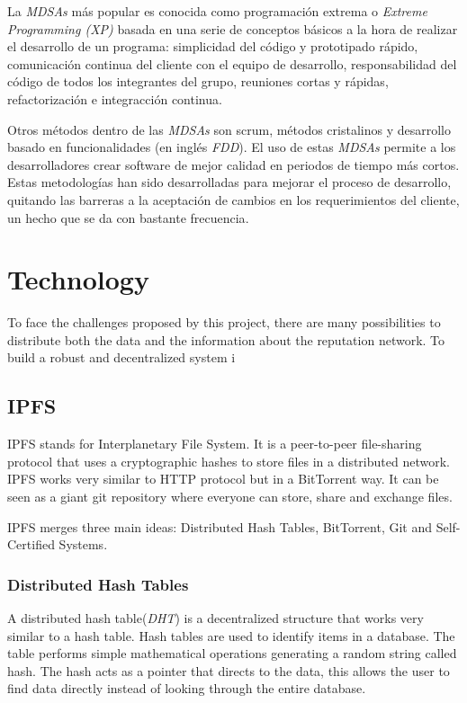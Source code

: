 La \emph{MDSAs} más popular es conocida como programación extrema o
\emph{Extreme Programming (XP)}\cite{lindstrom2004extreme} basada en una serie
de conceptos básicos a la hora de realizar el desarrollo de un programa:
simplicidad del código y prototipado rápido, comunicación continua del cliente
con el equipo de desarrollo, responsabilidad del código de todos los integrantes
del grupo, reuniones cortas y rápidas, refactorización e integracción
continua.\cite{theunissen2005search,livermore2008factors}

Otros métodos dentro de las \emph{MDSAs} son scrum\cite{rising2000scrum},
métodos cristalinos\cite{cockburn2004crystal} y desarrollo basado en
funcionalidades (en inglés \emph{FDD})\cite{coad1999java}. El uso de estas
\emph{MDSAs} permite a los desarrolladores crear software de mejor calidad en
periodos de tiempo más cortos. Estas metodologías han sido desarrolladas para
mejorar el proceso de desarrollo, quitando las barreras a la aceptación de
cambios en los requerimientos del cliente, un hecho que se da con bastante
frecuencia\cite{lindstrom2004extreme}.

\section{Technology}
\label{tech}
To face the challenges proposed by this project, there are many possibilities to
distribute both the data and the information about the reputation network. To
build a robust and decentralized system i

\subsection{IPFS}
\label{tech:sec:ipfs}
IPFS stands for Interplanetary File System. It is a peer-to-peer file-sharing
protocol that uses a cryptographic hashes to store files in a distributed
network. IPFS works very similar to HTTP protocol but in a BitTorrent way. It
can be seen as a giant git repository where everyone can store, share and
exchange files\cite{benet2014ipfs}.

IPFS merges three main ideas: Distributed Hash Tables, BitTorrent, Git and
Self-Certified Systems.

\subsubsection{Distributed Hash Tables}
\label{tech:sec:ipfs:dht}
A distributed hash table(\emph{DHT}) is a decentralized structure that works
very similar to a hash table. Hash tables are used to identify items in a
database. The table performs simple mathematical operations generating a random
string called hash. The hash acts as a pointer that directs to the data, this
allows the user to find data directly instead of looking through the entire
database\cite{kaluszka2010distributed}.

